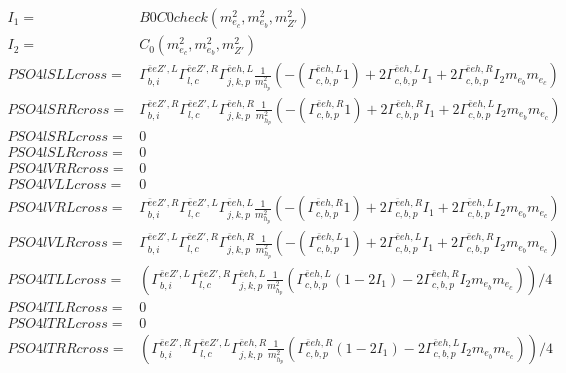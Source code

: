 \documentclass[A4,landscape]{article}
\begin{document}
\begin{align} 
I_1= & B0C0check(m^2_{e_{{c}}}, m^2_{e_{{b}}}, m^2_{{Z'}}) \\ 
I_2= & C_0(m^2_{e_{{c}}}, m^2_{e_{{b}}}, m^2_{{Z'}}) \\ 
  PSO4lSLLcross= &  \Gamma^{\bar{e}e {Z'} ,L}_{b, i} \Gamma^{\bar{e}e {Z'} ,R}_{l, c} \Gamma^{\bar{e}e h ,L}_{j, k, p} \frac{1}{m^2_{h_{{p}}}} (-(\Gamma^{\bar{e}e h ,L}_{c, b, p} 1) + 2 \Gamma^{\bar{e}e h ,L}_{c, b, p} I_1 + 2 \Gamma^{\bar{e}e h ,R}_{c, b, p} I_2 m_{e_{{b}}} m_{e_{{c}}}) \\ 
  PSO4lSRRcross= &  \Gamma^{\bar{e}e {Z'} ,R}_{b, i} \Gamma^{\bar{e}e {Z'} ,L}_{l, c} \Gamma^{\bar{e}e h ,R}_{j, k, p} \frac{1}{m^2_{h_{{p}}}} (-(\Gamma^{\bar{e}e h ,R}_{c, b, p} 1) + 2 \Gamma^{\bar{e}e h ,R}_{c, b, p} I_1 + 2 \Gamma^{\bar{e}e h ,L}_{c, b, p} I_2 m_{e_{{b}}} m_{e_{{c}}}) \\ 
  PSO4lSRLcross= & 0 \\ 
  PSO4lSLRcross= & 0 \\ 
  PSO4lVRRcross= & 0 \\ 
  PSO4lVLLcross= & 0 \\ 
  PSO4lVRLcross= &  \Gamma^{\bar{e}e {Z'} ,R}_{b, i} \Gamma^{\bar{e}e {Z'} ,L}_{l, c} \Gamma^{\bar{e}e h ,L}_{j, k, p} \frac{1}{m^2_{h_{{p}}}} (-(\Gamma^{\bar{e}e h ,R}_{c, b, p} 1) + 2 \Gamma^{\bar{e}e h ,R}_{c, b, p} I_1 + 2 \Gamma^{\bar{e}e h ,L}_{c, b, p} I_2 m_{e_{{b}}} m_{e_{{c}}}) \\ 
  PSO4lVLRcross= &  \Gamma^{\bar{e}e {Z'} ,L}_{b, i} \Gamma^{\bar{e}e {Z'} ,R}_{l, c} \Gamma^{\bar{e}e h ,R}_{j, k, p} \frac{1}{m^2_{h_{{p}}}} (-(\Gamma^{\bar{e}e h ,L}_{c, b, p} 1) + 2 \Gamma^{\bar{e}e h ,L}_{c, b, p} I_1 + 2 \Gamma^{\bar{e}e h ,R}_{c, b, p} I_2 m_{e_{{b}}} m_{e_{{c}}}) \\ 
  PSO4lTLLcross= & ( \Gamma^{\bar{e}e {Z'} ,L}_{b, i} \Gamma^{\bar{e}e {Z'} ,R}_{l, c} \Gamma^{\bar{e}e h ,L}_{j, k, p} \frac{1}{m^2_{h_{{p}}}} (\Gamma^{\bar{e}e h ,L}_{c, b, p} (1 - 2 I_1) - 2 \Gamma^{\bar{e}e h ,R}_{c, b, p} I_2 m_{e_{{b}}} m_{e_{{c}}}))/4 \\ 
  PSO4lTLRcross= & 0 \\ 
  PSO4lTRLcross= & 0 \\ 
  PSO4lTRRcross= & ( \Gamma^{\bar{e}e {Z'} ,R}_{b, i} \Gamma^{\bar{e}e {Z'} ,L}_{l, c} \Gamma^{\bar{e}e h ,R}_{j, k, p} \frac{1}{m^2_{h_{{p}}}} (\Gamma^{\bar{e}e h ,R}_{c, b, p} (1 - 2 I_1) - 2 \Gamma^{\bar{e}e h ,L}_{c, b, p} I_2 m_{e_{{b}}} m_{e_{{c}}}))/4 \\ 
\end{align} 
\end{document}
